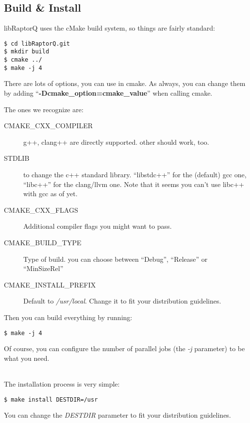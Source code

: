 \documentclass[11pt,a4paper]{refart}
\begin{document}
\subsection{Build \& Install}

libRaptorQ uses the cMake build system, so things are fairly standard:

\begin{verbatim}
$ cd libRaptorQ.git
$ mkdir build
$ cmake ../
$ make -j 4
\end{verbatim}

There are lots of options, you can use in cmake. As always, you can change them by adding ``\textbf{-Dcmake\_option=cmake\_value}'' when calling cmake.

The ones we recognize are:

\begin{description}
\item[CMAKE\_CXX\_COMPILER] g++, clang++ are directly supported. other should work, too.
\item[STDLIB] to change the c++ standard library. ``libstdc++'' for the (default) gcc one, ``libc++'' for the clang/llvm one. Note that it seems you can't use libc++ with gcc as of yet.
\item[CMAKE\_CXX\_FLAGS] Additional compiler flags you might want to pass.
\item[CMAKE\_BUILD\_TYPE] Type of build. you can choose between ``Debug'', ``Release'' or ``MinSizeRel''
\item[CMAKE\_INSTALL\_PREFIX] Default to \textit{/usr/local}. Change it to fit your distribution guidelines.
\end{description}

Then you can build everything by running:
\begin{verbatim}
$ make -j 4
\end{verbatim}

Of course, you can configure the number of parallel jobs (the \textit{-j} parameter) to be what you need.

~\\

The installation process is very simple:

\begin{verbatim}
$ make install DESTDIR=/usr
\end{verbatim}

You can change the \textit{DESTDIR} parameter to fit your distribution guidelines.
\newpage
\end{document}
